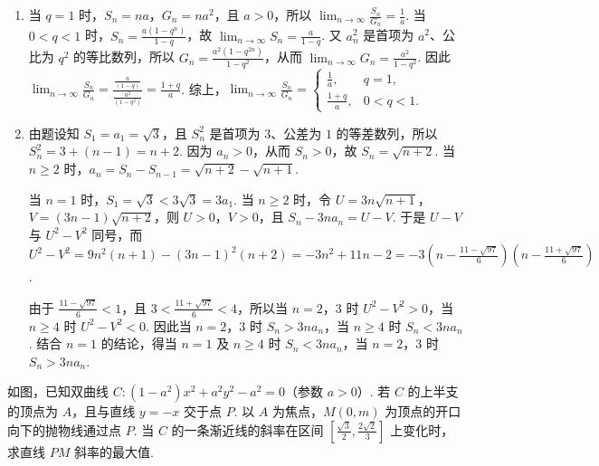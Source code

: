 \documentclass[UTF8,a4paper,oneside,11pt]{ctexbook}
\begin{document}
\begin{solution}
\begin{enumerate}
\item 当 \(q=1\) 时，\(S_n=na\)，\(G_n=na^2\)，且 \(a>0\)，所以 \(\displaystyle\lim_{n\to\infty}\frac{S_n}{G_n}=\frac{1}{a}\). 当 \(0<q<1\) 时，\(S_n=\frac{a(1-q^n)}{1-q}\)，故 \(\displaystyle\lim_{n\to\infty}S_n=\frac{a}{1-q}\). 又 \(a_n^2\) 是首项为 \(a^2\)、公比为 \(q^2\) 的等比数列，所以 \(G_n=\frac{a^2(1-q^{2n})}{1-q^2}\)，从而 \(\displaystyle\lim_{n\to\infty}G_n=\frac{a^2}{1-q^2}\). 因此 \(\displaystyle\lim_{n\to\infty}\frac{S_n}{G_n}=\frac{\frac{a}{(1-q)}}{\frac{a^2}{(1-q^2)}}=\frac{1+q}{a}\). 综上，\(\displaystyle\lim_{n\to\infty}\frac{S_n}{G_n}=\begin{cases}
\frac{1}{a}, & q=1,\\
\frac{1+q}{a}, & 0<q<1.
\end{cases}\)

\item 由题设知 \(S_1=a_1=\sqrt{3}\)，且 \(S_n^2\) 是首项为 \(3\)、公差为 \(1\) 的等差数列，所以 \(S_n^2=3+(n-1)=n+2\). 因为 \(a_n>0\)，从而 \(S_n>0\)，故 \(S_n=\sqrt{n+2}\). 当 \(n\geqslant2\) 时，\(a_n=S_n-S_{n-1}=\sqrt{n+2}-\sqrt{n+1}\).

当 \(n=1\) 时，\(S_1=\sqrt{3}<3\sqrt{3}=3a_1\). 当 \(n\geqslant2\) 时，令 \(U=3n\sqrt{n+1}\)，\(V=(3n-1)\sqrt{n+2}\)，则 \(U>0\)，\(V>0\)，且 \(S_n-3na_n=U-V\). 于是 \(U-V\) 与 \(U^2-V^2\) 同号，而
\(U^2-V^2=9n^2(n+1)-(3n-1)^2(n+2)=-3n^2+11n-2=-3\left(n-\frac{11-\sqrt{97}}{6}\right)\left(n-\frac{11+\sqrt{97}}{6}\right)\).

由于 \(\frac{11-\sqrt{97}}{6}<1\)，且 \(3<\frac{11+\sqrt{97}}{6}<4\)，所以当 \(n=2\)，\(3\) 时 \(U^2-V^2>0\)，当 \(n\geqslant4\) 时 \(U^2-V^2<0\). 因此当 \(n=2\)，\(3\) 时 \(S_n>3na_n\)，当 \(n\geqslant4\) 时 \(S_n<3na_n\). 结合 \(n=1\) 的结论，得当 \(n=1\) 及 \(n\geqslant4\) 时 \(S_n<3na_n\)，当 \(n=2\)，\(3\) 时 \(S_n>3na_n\).
\end{enumerate}
\end{solution}

\begin{problem}
如图，已知双曲线 \(C: (1 - a^2)x^2 + a^2y^2 - a^2 = 0\)（参数 \(a > 0\)）. 若 \(C\) 的上半支的顶点为 \(A\)，且与直线 \(y = -x\) 交于点 \(P\). 以 \(A\) 为焦点，\(M(0,m)\) 为顶点的开口向下的抛物线通过点 \(P\). 当 \(C\) 的一条渐近线的斜率在区间 \(\left[\frac{\sqrt{3}}{2}, \frac{2\sqrt{2}}{3}\right]\) 上变化时，求直线 \(PM\) 斜率的最大值.

\end{problem}
\end{document}
